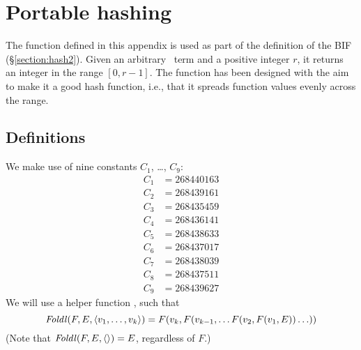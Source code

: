 %
%
%
%
%
%
%

\chapter{Portable hashing}

\label{chapter:hashing}

The function  defined in this appendix is used as part of the
definition of the BIF  (\S\ref{section:hash2}).
Given an arbitrary \Erlang\ term and a positive integer $r$, it returns
an integer in the range $[0,r-1]$.  The function has been designed with
the aim to make it a good hash function, i.e., that it spreads function
values evenly across the range.

\section{Definitions}

We make use of nine constants $C_1$, \ldots, $C_9$:
\begin{align*}
C_1 &= 268440163 \\
C_2 &= 268439161 \\
C_3 &= 268435459 \\
C_4 &= 268436141 \\
C_5 &= 268438633 \\
C_6 &= 268437017 \\
C_7 &= 268438039 \\
C_8 &= 268437511 \\
C_9 &= 268439627
\end{align*}
We will use a helper function , such that
\[{\it Foldl}(F,E,\langle v_1,\ldots,v_k\rangle) =
F(v_k,F(v_{k-1},\ldots F(v_2,F(v_1,E)) \ldots))\]
(Note that ${\it Foldl}(F,E,\langle\rangle) = E$, regardless of $F$.)

